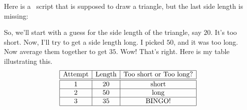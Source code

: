 \documentclass{ximera}
\begin{document}
\begin{question}
  Here is a \snap\ script that is supposed to draw a triangle, but the
  last side length is missing:
  
  \begin{freeResponse}
    So, we'll start with a guess for the side length of the triangle,
    say $20$. It's too short. Now, I'll try to get a side length
    long. I picked $50$, and it was too long. Now average them
    together to get $35$. Wow! That's right.  Here is my table
    illustrating this.
    \[
  \begin{array}{|c|c|c|c|}\hline
    \text{Attempt} & \text{Length} & \text{Too short or Too long?} \\ \hline\hline
    1 & 20 & \text{short} \\ \hline
    2 & 50 & \text{long} \\ \hline
    3 & 35 & \text{BINGO!} \\ \hline
  \end{array}
  \]
\end{freeResponse}
\end{question}
\mynewpage
\end{document}
